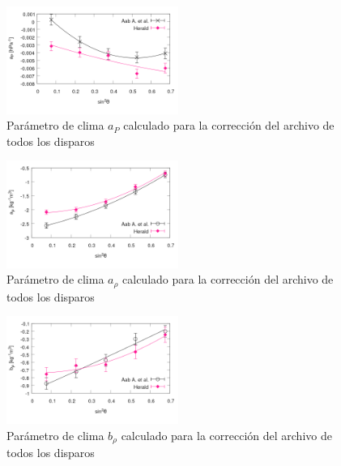 \begin{figure}[H]
	\centering
	\includegraphics[width=0.5\textwidth]{ap_6t5.png}
	\caption{Parámetro de clima $a_P$ calculado para la corrección del archivo de todos los disparos}
\end{figure}

\begin{figure}[H]
	\centering
	\includegraphics[width=0.5\textwidth]{arho_6t5.png}
	\caption{Parámetro de clima $a_\rho$ calculado para la corrección del archivo de todos los disparos}
\end{figure}

\begin{figure}[H]
	\centering
	\includegraphics[width=0.5\textwidth]{brho_6t5.png}
	\caption{Parámetro de clima $b_\rho$ calculado para la corrección del archivo de todos los disparos}
\end{figure}




